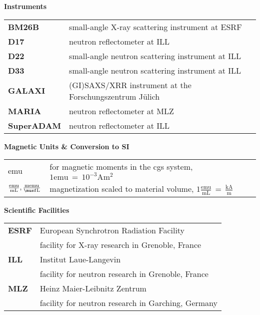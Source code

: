 \documentclass[\main/dresen_thesis.tex]{subfiles}
\begin{document}
	\noindent \textbf{Instruments}
	\begin{table}[H]
			\begin{tabular}{p{3cm}l}
        \textbf{BM26B}        & small-angle X-ray scattering instrument at ESRF \\
        \textbf{D17}          & neutron reflectometer at ILL \\
        \textbf{D22}          & small-angle neutron scattering instrument at ILL \\
        \textbf{D33}          & small-angle neutron scattering instrument at ILL \\
        \textbf{GALAXI}       & (GI)SAXS/XRR instrument at the Forschungszentrum J\"ulich\\
        \textbf{MARIA}        & neutron reflectometer at MLZ \\
        \textbf{SuperADAM}    & neutron reflectometer at ILL \\
			\end{tabular}
  \end{table}

	\noindent \textbf{Magnetic Units \& Conversion to SI}
	\begin{table}[H]
      \begin{tabular}{p{3cm}l}
        emu & for magnetic moments in the cgs system, $1 \mathrm{emu} \, = \, 10^{-3} \mathrm{A m^{2}}$ \\
        $\frac{\mathrm{emu}}{\mathrm{mL}}, \frac{\mathrm{memu}}{\mathrm{\musf L}}$ & magnetization scaled to material volume, $1 \frac{\mathrm{emu}}{\mathrm{mL}} \, = \, \frac{\mathrm{kA}}{\mathrm{m}}$ \\
			\end{tabular}
  \end{table}

  \noindent \textbf{Scientific Facilities}
    \begin{table}[H]
      \begin{tabular}{p{3cm}l}
        \textbf{ESRF}         & European Synchrotron Radiation Facility\\
                              & facility for X-ray research in Grenoble, France \\
        \textbf{ILL}          & Institut Laue-Langevin\\
                              & facility for neutron research in Grenoble, France \\
        \textbf{MLZ}          & Heinz Maier-Leibnitz Zentrum\\
                              & facility for neutron research in Garching, Germany \\
      \end{tabular}
    \end{table}
\end{document}
